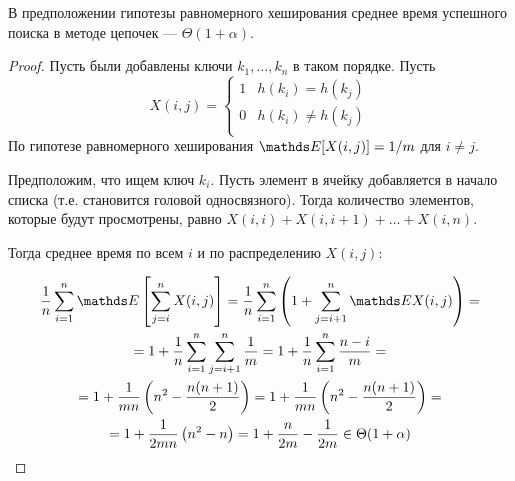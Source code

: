 \begin{theorem}
    В предположении гипотезы равномерного хеширования
    среднее время успешного поиска в методе цепочек
    --- $\Theta(1 + \alpha)$.
\end{theorem}
\begin{proof}
    Пусть были добавлены ключи $k_1, \ldots, k_n$
    в таком порядке.
    Пусть
    \[
        X(i, j) =
        \begin{cases}
            1 & h(k_i) = h(k_j) \\
            0 & h(k_i) \ne h(k_j) \\
        \end{cases}
    \]
    По гипотезе равномерного хеширования
    $\E[X(i, j)] = 1/m$ для $i \ne j$.

    Предположим, что ищем ключ $k_i$.
    Пусть элемент в ячейку добавляется в начало списка
    (т.е. становится головой односвязного).
    Тогда количество элементов,
    которые будут просмотрены,
    равно $X(i, i) + X(i, i + 1) + \ldots + X(i, n)$.

    Тогда среднее время по всем $i$ и по
    распределению $X(i, j)$:

    \begin{gather*}
        \frac{1}{n} \sum_{i=1}^n \E \brackets{\sum_{j=i}^n X(i, j)}
        = \frac{1}{n} \sum_{i=1}^n \parens{1 + \sum_{j = i + 1}^n \E X(i, j)} = \\
        = 1 + \frac{1}{n} \sum_{i=1}^n \sum_{j = i + 1}^n \frac{1}{m}
        = 1 + \frac{1}{n} \sum_{i=1}^n \frac{n - i}{m} = \\
        = 1 + \frac{1}{mn} \parens{n^2 - \frac{n (n + 1)}{2}}
        = 1 + \frac{1}{mn} \parens{n^2 - \frac{n (n + 1)}{2}} = \\
        = 1 + \frac{1}{2mn} \parens{n^2 - n}
        = 1 + \frac{n}{2m} - \frac{1}{2m} \in \Theta(1 + \alpha) \\
    \end{gather*}
\end{proof}
